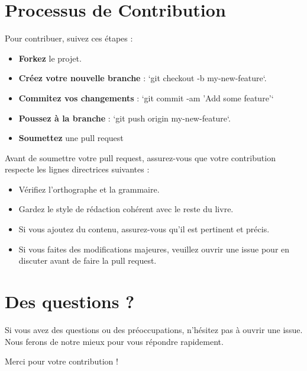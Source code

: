 \section*{Processus de Contribution}

Pour contribuer, suivez ces étapes :
\begin{itemize}
    \item \textbf{Forkez} le projet.
    \item \textbf{Créez votre nouvelle branche} : `git checkout -b my-new-feature`.
    \item \textbf{Commitez vos changements} : `git commit -am 'Add some feature'`
    \item \textbf{Poussez à la branche} : `git push origin my-new-feature`.
    \item \textbf{Soumettez} une pull request
\end{itemize}
\vspace {0.5cm}

Avant de soumettre votre pull request, assurez-vous que votre contribution respecte les lignes directrices suivantes :

\begin{itemize}
    \item Vérifiez l'orthographe et la grammaire.
    \item Gardez le style de rédaction cohérent avec le reste du livre.
    \item Si vous ajoutez du contenu, assurez-vous qu'il est pertinent et précis.
    \item Si vous faites des modifications majeures, veuillez ouvrir une issue pour en discuter avant de faire la pull request.
\end{itemize}

\section*{Des questions ?}

Si vous avez des questions ou des préoccupations, n'hésitez pas à ouvrir une issue. Nous ferons de notre mieux pour vous répondre rapidement.

Merci pour votre contribution !

